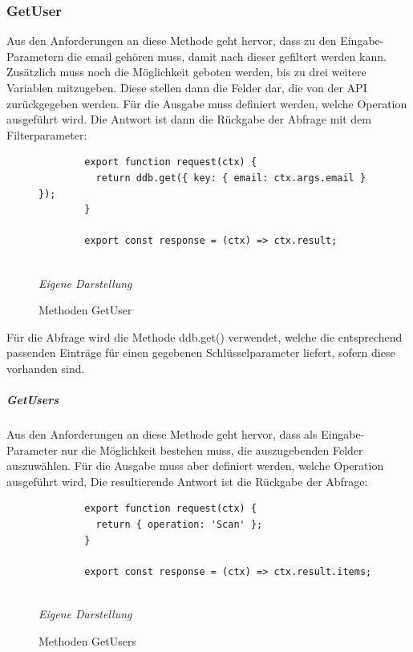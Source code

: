 		\subsubsection{GetUser}
		
	Aus den Anforderungen an diese Methode geht hervor, dass zu den Eingabe-Parametern die email gehören muss, damit nach dieser gefiltert werden kann. Zusätzlich muss noch die Möglichkeit geboten werden, bis zu drei weitere Variablen mitzugeben. Diese stellen dann die Felder dar, die von der API zurückgegeben werden. Für die Ausgabe muss definiert werden, welche Operation ausgeführt wird. Die Antwort ist dann die Rückgabe der Abfrage mit dem Filterparameter:\newline
	
		\begin{figure}[H]
		\centering
		\begin{minipage}[t]{.7\textwidth} %
		\caption{Methoden GetUser} %
		\begin{verbatim}
		export function request(ctx) {
		  return ddb.get({ key: { email: ctx.args.email } });
		}
		
		export const response = (ctx) => ctx.result;
		
		\end{verbatim}
		
		\textit{Eigene Darstellung} %
		\label{fig:getUserMethoden}
		\end{minipage}
		\end{figure}
	Für die Abfrage wird die Methode ddb.get() verwendet, welche die entsprechend passenden Einträge für einen gegebenen Schlüsselparameter liefert, sofern diese vorhanden sind.
	\subparagraph{GetUsers}
	Aus den Anforderungen an diese Methode geht hervor, dass als Eingabe-Parameter nur die Möglichkeit bestehen muss, die auszugebenden Felder auszuwählen. Für die Ausgabe muss aber definiert werden, welche Operation ausgeführt wird, \newpage Die resultierende Antwort ist die Rückgabe der Abfrage:\newline
		\begin{figure}[H]
		\centering
		\begin{minipage}[t]{.7\textwidth} %
		\caption{Methoden GetUsers} %
		\begin{verbatim}
		export function request(ctx) {
		  return { operation: 'Scan' };
		}
		
		export const response = (ctx) => ctx.result.items;
		
		\end{verbatim}
		
		\textit{Eigene Darstellung} %
		\label{fig:getUsersMethoden}
		\end{minipage}
		\end{figure}
